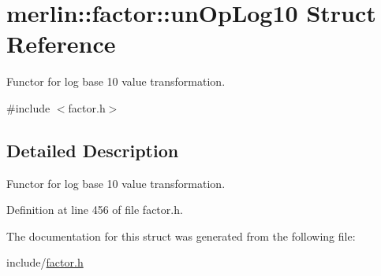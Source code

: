 \hypertarget{structmerlin_1_1factor_1_1unOpLog10}{}\section{merlin\+:\+:factor\+:\+:un\+Op\+Log10 Struct Reference}
\label{structmerlin_1_1factor_1_1unOpLog10}


Functor for log base 10 value transformation.  




{\ttfamily \#include $<$factor.\+h$>$}



\subsection{Detailed Description}
Functor for log base 10 value transformation. 

Definition at line 456 of file factor.\+h.



The documentation for this struct was generated from the following file\+:\begin{DoxyCompactItemize}
\item 
include/\hyperlink{factor_8h}{factor.\+h}\end{DoxyCompactItemize}

